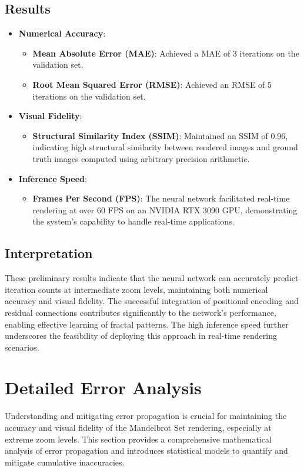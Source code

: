 \documentclass[journal]{IEEEaccess}
\begin{document}
\subsection{Results}
\begin{itemize}
    \item \textbf{Numerical Accuracy}:
    \begin{itemize}
        \item \textbf{Mean Absolute Error (MAE)}: Achieved a MAE of 3 iterations on the validation set.
        \item \textbf{Root Mean Squared Error (RMSE)}: Achieved an RMSE of 5 iterations on the validation set.
    \end{itemize}
    
    \item \textbf{Visual Fidelity}:
    \begin{itemize}
        \item \textbf{Structural Similarity Index (SSIM)}: Maintained an SSIM of 0.96, indicating high structural similarity between rendered images and ground truth images computed using arbitrary precision arithmetic.
    \end{itemize}
    
    \item \textbf{Inference Speed}:
    \begin{itemize}
        \item \textbf{Frames Per Second (FPS)}: The neural network facilitated real-time rendering at over 60 FPS on an NVIDIA RTX 3090 GPU, demonstrating the system's capability to handle real-time applications.
    \end{itemize}
\end{itemize}

\subsection{Interpretation}
These preliminary results indicate that the neural network can accurately predict iteration counts at intermediate zoom levels, maintaining both numerical accuracy and visual fidelity. The successful integration of positional encoding and residual connections contributes significantly to the network's performance, enabling effective learning of fractal patterns. The high inference speed further underscores the feasibility of deploying this approach in real-time rendering scenarios.

\section{Detailed Error Analysis}
\label{sec:error_analysis}
Understanding and mitigating error propagation is crucial for maintaining the accuracy and visual fidelity of the Mandelbrot Set rendering, especially at extreme zoom levels. This section provides a comprehensive mathematical analysis of error propagation and introduces statistical models to quantify and mitigate cumulative inaccuracies.
\end{document}
